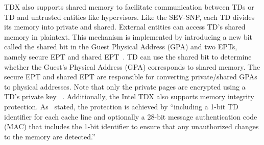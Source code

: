 TDX also supports shared memory to facilitate communication between TDs or TD and untrusted entities like hypervisors. Like the SEV-SNP, each TD divides its memory into private and shared. External entities can access TD's shared memory in plaintext. This mechanism is implemented by introducing a 
new bit called the shared bit in the Guest Physical Address (GPA) and two EPTs, namely secure EPT and shared EPT~\cite*{Intel_tdx_whitepaper}. TD can use the shared bit to determine whether the Guest's Physical Address (GPA) corresponds to shared memory. The secure EPT and shared EPT are 
responsible for converting private/shared GPAs to physical addresses. Note that only the private pages are encrypted using a TD's private key ~\cite*{Intel_tdx_whitepaper}. Additionally, the Intel TDX also supports memory integrity protection. As~\cite*{kollendageneral} stated, the protection is 
achieved by \enquote{including a 1-bit TD identifier for each cache line and optionally a 28-bit message authentication code (MAC) that includes the 1-bit identifier to ensure that any unauthorized changes to the memory are detected.}



